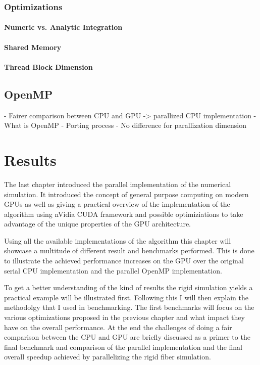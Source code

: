 \documentclass[a4paper,11pt]{kth-mag}
\begin{document}
\subsection{Optimizations}
\subsubsection{Numeric vs. Analytic Integration}
\subsubsection{Shared Memory}
\subsubsection{Thread Block Dimension}
\section{OpenMP}

- Fairer comparison between CPU and GPU -> parallized CPU implementation
- What is OpenMP
- Porting process
- No difference for parallization dimension

\chapter{Results}
The last chapter introduced the parallel implementation of the numerical simulation. It introduced the concept of general purpose computing on modern GPUs as well as giving a practical overview of the implementation of the algorithm using nVidia CUDA framework and possible optimiziations to take advantage of the unique properties of the GPU architecture.

Using all the available implementations of the algorithm this chapter will showcase a multitude of different result and benchmarks performed. This is done to illustrate the achieved performance increases on the GPU over the original serial CPU implementation and the parallel OpenMP implementation.

To get a better understanding of the kind of results the rigid simulation yields a practical example will be illustrated first. Following this I will then explain the methodolgy that I used in benchmarking. The first benchmarks will focus on the various optimizations proposed in the previous chapter and what impact they have on the overall performance. At the end the challenges of doing a fair comparison between the CPU and GPU are briefly discussed as a primer to the final benchmark and comparison of the parallel implementation and the final overall speedup achieved by parallelizing the rigid fiber simulation.
\end{document}

